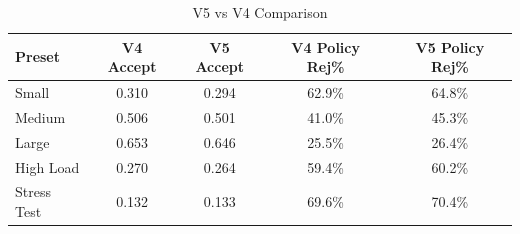 \begin{table}[h]
\centering
\caption{V5 vs V4 Comparison}
\label{tab:comparison}
\begin{tabular}{lcccc}
\toprule
Preset & V4 Accept & V5 Accept & V4 Policy Rej\% & V5 Policy Rej\% \\
\midrule
Small & 0.310 & 0.294 & 62.9\% & 64.8\% \\
Medium & 0.506 & 0.501 & 41.0\% & 45.3\% \\
Large & 0.653 & 0.646 & 25.5\% & 26.4\% \\
High Load & 0.270 & 0.264 & 59.4\% & 60.2\% \\
Stress Test & 0.132 & 0.133 & 69.6\% & 70.4\% \\
\bottomrule
\end{tabular}
\end{table}
